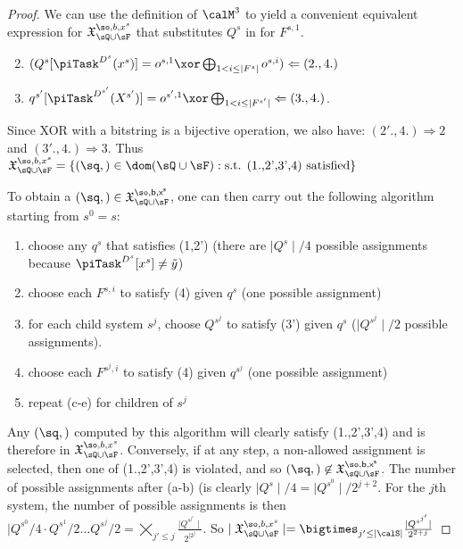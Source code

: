 \begin{proof}
We can use the definition of $\calM^3$ to yield a convenient equivalent expression for 
$\mathfrak{X}^{\so,b,x^s}_{\sQ \cup \sF}$ that substitutes $Q^s$ in for $F^{s,1}$.

\begin{enumerate}[label={\arabic*$'$.}] \setcounter{enumi}{1}
\item $(Q^s[\piTask^{D^s}(x^s)]=o^{s,1}\xor \bigoplus_{1 < i \leq \mid F^s\mid} o^{s,i}) \Leftarrow (2.,4.)$
\item $q^{s'}[\piTask^{D^{s'}}(X^{s'})]=o^{s',1} \xor \bigoplus_{1 < i \leq \mid F^{s'}\mid} \Leftarrow (3.,4.)$.
\end{enumerate}
Since XOR with a bitstring is a bijective operation, we also have: $(2'.,4.) \Rightarrow 2$ and $(3'.,4.) \Rightarrow 3$.
Thus $\mathfrak{X}^{\so,b,x^s}_{\sQ \cup \sF}= \{(\sq,\sf) \in \dom(\sQ \cup \sF):\text{s.t. (1.,2',3',4) satisfied}\}$

To obtain a $(\sq,\sf) \in \mathfrak{X}^{\so,b,x^s}_{\sQ \cup \sF}$, one can then carry out the following algorithm starting from $s^0=s$:
\begin{enumerate}[label=\alph*)]
\item choose any $q^s$ that satisfies (1,2') (there are $\mid Q^s \mid / 4$ possible assignments because $\piTask^{D^s}[x^s] \neq \tilde y$)
\item choose each $F^{s,i}$ to satisfy (4) given $q^s$ (one possible assignment)
\item for each child system $s^j$, choose $Q^{s^j}$ to satisfy (3') given $q^s$ ($\mid Q^{s^j} \mid / 2$ possible assignments).
\item choose each $F^{s^j,i}$ to satisfy (4) given $q^{s^j}$ (one possible assignment)
\item repeat (c-e) for children of $s^j$
\end{enumerate}

Any $(\sq,\sf)$ computed by this algorithm will clearly satisfy (1.,2',3',4) 
and is therefore in $\mathfrak{X}^{\so,b,x^s}_{\sQ \cup \sF}$.
Conversely, if at any step, a non-allowed assignment is selected, then one of (1.,2',3',4) 
is violated, and so $(\sq,\sf) \not \in \mathfrak{X}^{\so,b,x^s}_{\sQ \cup \sF}$.
The number of possible assignments after (a-b) (is clearly $\mid Q^s \mid / 4=\mid Q^{s^0} \mid / 2^{j+2}$.
For the $j$th system, the number of possible assignments is then 
$\mid Q^{s^0}/4 \cdot Q^{s^1}/2 \ldots Q^{s^j}/2 = \bigtimes_{j'\leq j} \frac{\mid Q^{s^{j'}}\mid}{2^{\mid 2^j}}$.
So $\mid \mathfrak{X}^{\so,b,x^s}_{\sQ \cup \sF} \mid = \bigtimes_{j'\leq \mid \calS \mid} \frac{\mid Q^{s^{j'}}\mid}{2^{2+j}}$



\end{proof}
